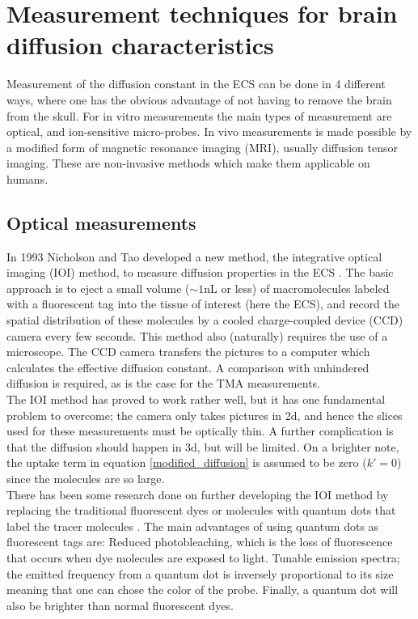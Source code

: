 \documentclass[a4paper,english, 12pt, twoside]{article}
\begin{document}
\section{Measurement techniques for brain diffusion characteristics}
Measurement of the diffusion constant in the ECS can be done in 4 different ways, where one has the obvious advantage of not having to remove the brain from the skull. 
For in vitro measurements the main types of measurement are optical, and ion-sensitive micro-probes. 
In vivo measurements is made possible by a modified form of magnetic resonance imaging (MRI), usually diffusion tensor imaging. These are non-invasive methods which make them applicable on humans.

\subsection{Optical measurements}
In 1993 Nicholson and Tao developed a new method, the integrative optical imaging (IOI) method, to measure diffusion properties in the ECS \cite{nicholson2001diffusion,nicholson1993hindered}.
The basic approach is to eject a small volume ($\sim 1$nL or less) of macromolecules labeled with a fluorescent tag into the tissue of interest (here the ECS), and record the spatial distribution of these molecules by a cooled charge-coupled device (CCD) camera every few seconds. 
This method also (naturally) requires the use of a microscope. 
The CCD camera transfers the pictures to a computer which calculates the effective diffusion constant. 
A comparison with unhindered diffusion is required, as is the case for the TMA measurements. \\
The IOI method has proved to work rather well, but it has one fundamental problem to overcome; the camera only takes pictures in 2d, and hence the slices used for these measurements must be optically thin. 
A further complication is that the diffusion should happen in 3d, but will be limited. 
On a brighter note, the uptake term in equation \ref{modified_diffusion} is assumed to be zero ($k' = 0$) since the molecules are so large.\\
There has been some research done on further developing the IOI method by replacing the traditional fluorescent dyes or molecules with quantum dots that label the tracer molecules \cite{dahan2003diffusion}. 
The main advantages of using quantum dots as fluorescent tags are: Reduced photobleaching, which is the loss of fluorescence that occurs when dye molecules are exposed to light. 
Tunable emission spectra; the emitted frequency from a quantum dot is inversely proportional to its size meaning that one can chose the color of the probe. 
Finally, a quantum dot will also be brighter than normal fluorescent dyes.
\end{document}
